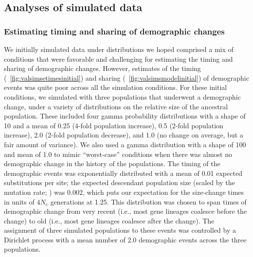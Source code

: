 \subsection{Analyses of simulated data}

\subsubsection{Estimating timing and sharing of demographic changes}

We initially simulated data under distributions we hoped comprised a mix of
conditions that were favorable and challenging for estimating the timing and
sharing of demographic changes.
However, estimates of the timing
(\fig{}~\ref{fig:valsimsetimesinitial})
and sharing
(\fig{}~\ref{fig:valsimsmodelinitial})
of demographic events was quite poor across all the simulation conditions.
For these initial conditions, we simulated \datasets with three populations
that underwent a demographic change, under a variety of distributions on the
relative size of the ancestral population.
These included four gamma probability distributions with a shape of 10 and a
mean of
0.25 (4-fold population increase),
0.5 (2-fold population increase),
2.0 (2-fold population decrease), and
1.0 (no change on average, but a fair amount of variance).
We also used a gamma distribution with a shape of 100 and mean of 1.0
to mimic ``worst-case'' conditions when there was almost no demographic
change in the history of the populations.
The timing of the demographic events was exponentially distributed with a mean
of 0.01 expected substitutions per site;
the expected descendant population size
(scaled by the mutation rate; \epopsize\murate)
was 0.002,
which puts our expectation for the size-change times in units of $4N_e$
generations at 1.25.
This distribution was chosen to span times of demographic change from very
recent (i.e., most gene lineages coalesce before the change) to old (i.e., most
gene lineages coalesce after the change).
The assignment of three simulated populations to these events was controlled by
a Dirichlet process with a mean number of 2.0 demographic events across the
three populations.

